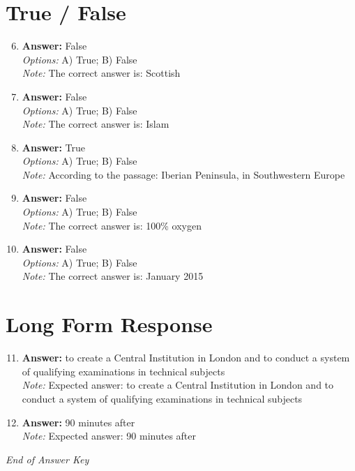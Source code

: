 \documentclass[12pt]{article}
\begin{document}
\section*{True / False}
\begin{enumerate}[label=\arabic*.]
\setcounter{enumi}{5}
\item \textbf{Answer:} False
\\ \textit{Options:} A) True; B) False
\\ \textit{Note:} The correct answer is: Scottish
\item \textbf{Answer:} False
\\ \textit{Options:} A) True; B) False
\\ \textit{Note:} The correct answer is: Islam
\item \textbf{Answer:} True
\\ \textit{Options:} A) True; B) False
\\ \textit{Note:} According to the passage: Iberian Peninsula, in Southwestern Europe
\item \textbf{Answer:} False
\\ \textit{Options:} A) True; B) False
\\ \textit{Note:} The correct answer is: 100\% oxygen
\item \textbf{Answer:} False
\\ \textit{Options:} A) True; B) False
\\ \textit{Note:} The correct answer is: January 2015
\end{enumerate}

\section*{Long Form Response}
\begin{enumerate}[label=\arabic*.]
\setcounter{enumi}{10}
\item \textbf{Answer:} to create a Central Institution in London and to conduct a system of qualifying examinations in technical subjects
\\ \textit{Note:} Expected answer: to create a Central Institution in London and to conduct a system of qualifying examinations in technical subjects
\item \textbf{Answer:} 90 minutes after
\\ \textit{Note:} Expected answer: 90 minutes after
\end{enumerate}

\vfill
\noindent\textit{End of Answer Key}
\end{document}
